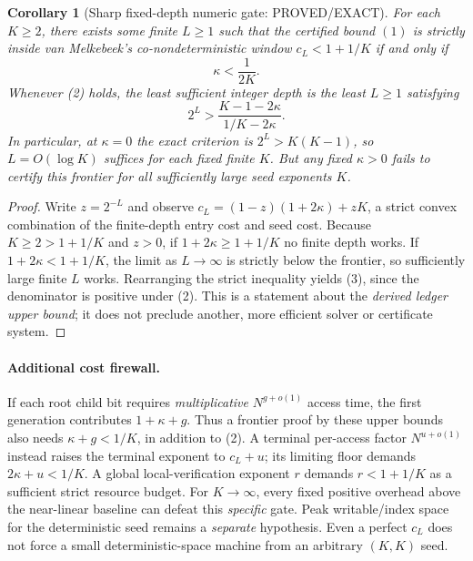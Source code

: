 \documentclass[11pt]{article}
\newtheorem{corollary}[theorem]{Corollary}
\begin{document}
\begin{corollary}[Sharp fixed-depth numeric gate: PROVED/EXACT]
For each $K\ge2$, there exists some finite $L\ge1$ such that the
certified bound $(1)$ is \emph{strictly} inside van Melkebeek's
co-nondeterministic window $c_L<1+1/K$ if and only if
\[
\boxed{\kappa<\frac{1}{2K}.}\tag{2}
\]
Whenever (2) holds, the least sufficient integer depth is the least
$L\ge1$ satisfying
\[
\boxed{2^L>\frac{K-1-2\kappa}{1/K-2\kappa}.}\tag{3}
\]
In particular, at $\kappa=0$ the exact criterion is
$2^L>K(K-1)$, so $L=O(\log K)$ suffices for each \emph{fixed}
finite $K$. But any \emph{fixed} $\kappa>0$ fails to certify this
frontier for all sufficiently large seed exponents $K$.
\end{corollary}
\begin{proof}
Write $z=2^{-L}$ and observe
$c_L=(1-z)(1+2\kappa)+zK$, a strict convex combination of the
finite-depth entry cost and seed cost. Because $K\ge2>1+1/K$
and $z>0$, if $1+2\kappa\ge1+1/K$ no finite depth works.
If $1+2\kappa<1+1/K$, the limit as $L\to\infty$ is strictly
below the frontier, so sufficiently large finite $L$ works.
Rearranging the strict inequality yields (3), since the denominator
is positive under (2). This is a statement about the \emph{derived
ledger upper bound}; it does not preclude another, more efficient
solver or certificate system.
\end{proof}

\paragraph{Additional cost firewall.}
If each root child bit requires \emph{multiplicative}
$N^{g+o(1)}$ access time, the first generation contributes
$1+\kappa+g$. Thus a frontier proof by these upper bounds also needs
$\kappa+g<1/K$, in addition to (2).
A terminal per-access factor $N^{u+o(1)}$ instead raises the
terminal exponent to $c_L+u$; its limiting floor demands
$2\kappa+u<1/K$. A global local-verification exponent $r$ demands
$r<1+1/K$ as a sufficient strict resource budget.
For $K\to\infty$, every fixed positive overhead above the
near-linear baseline can defeat this \emph{specific} gate.
Peak writable/index space for the deterministic seed remains a
\emph{separate} hypothesis. Even a perfect $c_L$ does not force a
small deterministic-space machine from an arbitrary $(K,K)$ seed.
\end{document}

